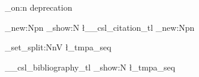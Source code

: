 \usepackage[enable-debug,check-declarations]{expl3}

\ExplSyntaxOn
\debug_on:n { deprecation }

\cs_new:Npn \showcitation
  { \tl_show:N \l__csl_citation_tl }
\cs_new:Npn \showbibliography
  {
    \seq_set_split:NnV \l_tmpa_seq { \par } \g__csl_bibliography_tl
    \seq_show:N \l_tmpa_seq
  }

\ExplSyntaxOff
